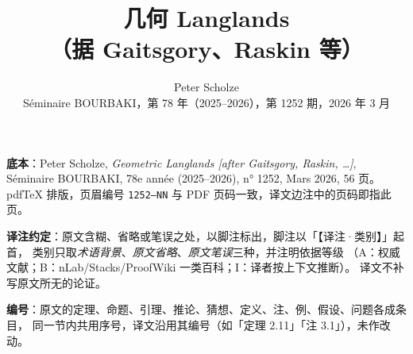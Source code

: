 \documentclass[11pt,a4paper]{article}
\title{几何 Langlands\\[0.4em]（据 Gaitsgory、Raskin 等）}
\author{Peter Scholze\\[0.3em]
\small Séminaire BOURBAKI，第 78 年（2025--2026），第 1252 期，2026 年 3 月}
\date{}
\begin{document}
\maketitle

\noindent\small
\textbf{底本}：Peter Scholze, \emph{Geometric Langlands [after Gaitsgory, Raskin, \dots]},
Séminaire BOURBAKI, 78e année (2025--2026), n° 1252, Mars 2026, 56 页。
pdfTeX 排版，页眉编号 \texttt{1252--NN} 与 PDF 页码一致，译文边注中的页码即指此页。

\medskip
\noindent\small
\textbf{译注约定}：原文含糊、省略或笔误之处，以脚注标出，脚注以「【译注·类别】」起首，
类别只取\emph{术语背景}、\emph{原文省略}、\emph{原文笔误}三种，并注明依据等级
（A：权威文献；B：nLab/Stacks/ProofWiki 一类百科；I：译者按上下文推断）。
译文不补写原文所无的论证。

\medskip
\noindent\small
\textbf{编号}：原文的定理、命题、引理、推论、猜想、定义、注、例、假设、问题各成条目，
同一节内共用序号，译文沿用其编号（如「定理 2.11」「注 3.1」），未作改动。

\normalsize
\tableofcontents
\newpage














\end{document}
